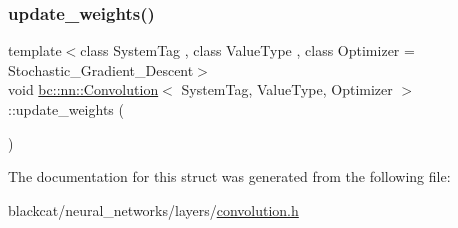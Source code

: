 \mbox{\label{structbc_1_1nn_1_1Convolution_a867b470dc738fb6b533d7c0065a858b9}} 
\subsubsection{\texorpdfstring{update\+\_\+weights()}{update\_weights()}}
{\footnotesize\ttfamily template$<$class System\+Tag , class Value\+Type , class Optimizer  = Stochastic\+\_\+\+Gradient\+\_\+\+Descent$>$ \\
void \hyperlink{structbc_1_1nn_1_1Convolution}{bc\+::nn\+::\+Convolution}$<$ System\+Tag, Value\+Type, Optimizer $>$\+::update\+\_\+weights (\begin{DoxyParamCaption}{ }\end{DoxyParamCaption})\hspace{0.3cm}{\ttfamily [inline]}}



The documentation for this struct was generated from the following file\+:\begin{DoxyCompactItemize}
\item 
blackcat/neural\+\_\+networks/layers/\hyperlink{convolution_8h}{convolution.\+h}\end{DoxyCompactItemize}
